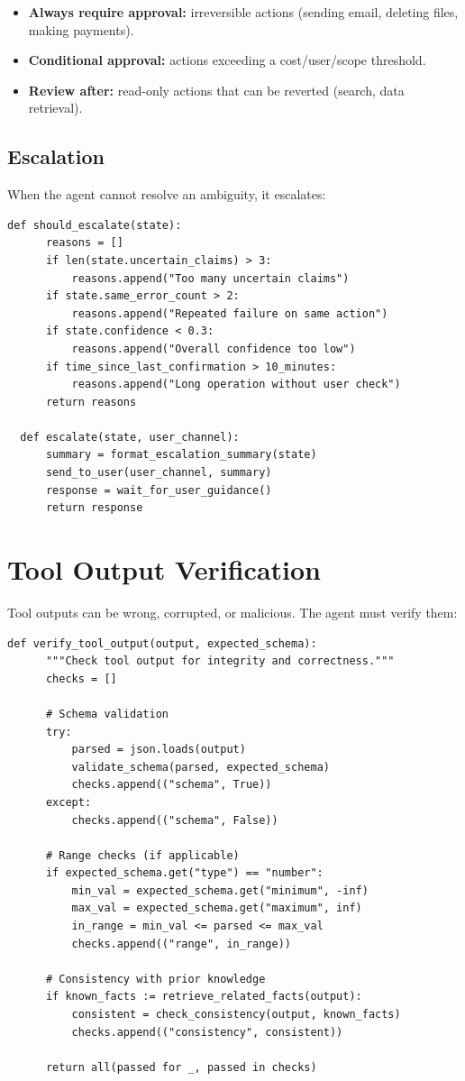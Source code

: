 \begin{itemize}
	\item \textbf{Always require approval:} irreversible actions (sending email, deleting files, making payments).
	\item \textbf{Conditional approval:} actions exceeding a cost/user/scope threshold.
	\item \textbf{Review after:} read-only actions that can be reverted (search, data retrieval).
\end{itemize}

\subsection{Escalation}

When the agent cannot resolve an ambiguity, it escalates:

\begin{lstlisting}[caption=Escalation logic]
  def should_escalate(state):
      reasons = []
      if len(state.uncertain_claims) > 3:
          reasons.append("Too many uncertain claims")
      if state.same_error_count > 2:
          reasons.append("Repeated failure on same action")
      if state.confidence < 0.3:
          reasons.append("Overall confidence too low")
      if time_since_last_confirmation > 10_minutes:
          reasons.append("Long operation without user check")
      return reasons

  def escalate(state, user_channel):
      summary = format_escalation_summary(state)
      send_to_user(user_channel, summary)
      response = wait_for_user_guidance()
      return response
\end{lstlisting}

\section{Tool Output Verification}

Tool outputs can be wrong, corrupted, or malicious. The agent must verify them:

\begin{lstlisting}[caption=Tool output verification]
  def verify_tool_output(output, expected_schema):
      """Check tool output for integrity and correctness."""
      checks = []

      # Schema validation
      try:
          parsed = json.loads(output)
          validate_schema(parsed, expected_schema)
          checks.append(("schema", True))
      except:
          checks.append(("schema", False))

      # Range checks (if applicable)
      if expected_schema.get("type") == "number":
          min_val = expected_schema.get("minimum", -inf)
          max_val = expected_schema.get("maximum", inf)
          in_range = min_val <= parsed <= max_val
          checks.append(("range", in_range))

      # Consistency with prior knowledge
      if known_facts := retrieve_related_facts(output):
          consistent = check_consistency(output, known_facts)
          checks.append(("consistency", consistent))

      return all(passed for _, passed in checks)
\end{lstlisting}


